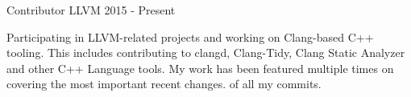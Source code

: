 
\begin{cventries}

  \cventry
    {Contributor}
    {LLVM}
    {}
    {2015 - Present}
    {
      \begin{cvitems}
        Participating in LLVM-related projects and working on Clang-based C++
        tooling. This includes contributing to clangd, Clang-Tidy, Clang
        Static Analyzer and other C++ Language tools. My work has been
        featured multiple times on 
        covering the most important recent changes.
        of all my commits.
      \end{cvitems}
    }

\end{cventries}
